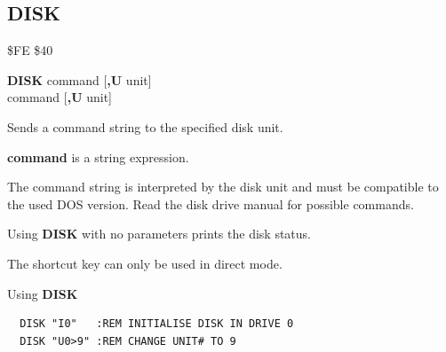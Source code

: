 \subsection{DISK}
\begin{description}[leftmargin=2cm,style=nextline]
\item [Token:] \$FE \$40
\item [Format:] {\bf DISK} command [{\bf,U} unit] \\
                 command [{\bf,U} unit]
\item [Usage:]
   Sends a command string to the specified disk unit.

   \unitdefinition

   {\bf command} is a string expression.

\item [Remarks:]
   The command string is interpreted by the disk unit
   and must be compatible to the used DOS version.
   Read the disk drive manual for possible commands.

   Using {\bf DISK} with no parameters prints the disk status.

   The shortcut key  can only be used in direct mode.

\item [Examples:] Using {\bf DISK}
\begin{tcolorbox}[colback=black,coltext=white]
\verbatimfont{\codefont}
\begin{verbatim}
  DISK "I0"   :REM INITIALISE DISK IN DRIVE 0
  DISK "U0>9" :REM CHANGE UNIT# TO 9
\end{verbatim}
\end{tcolorbox}
\end{description}


\newpage
